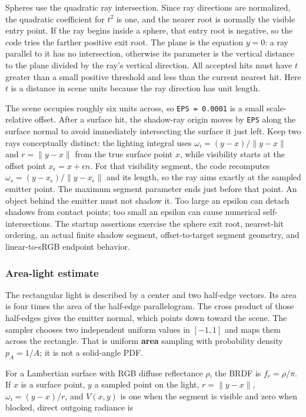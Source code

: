 Spheres use the quadratic ray intersection. Since ray directions are normalized, the quadratic coefficient for \(t^2\) is one, and the nearer root is normally the visible entry point. If the ray begins inside a sphere, that entry root is negative, so the code tries the farther positive exit root. The plane is the equation \(y=0\): a ray parallel to it has no intersection, otherwise its parameter is the vertical distance to the plane divided by the ray's vertical direction. All accepted hits must have \(t\) greater than a small positive threshold and less than the current nearest hit. Here \(t\) is a distance in scene units because the ray direction has unit length.

The scene occupies roughly six units across, so \texttt{EPS\ =\ 0.0001} is a small scale-relative offset. After a surface hit, the shadow-ray origin moves by \texttt{EPS} along the surface normal to avoid immediately intersecting the surface it just left. Keep two rays conceptually distinct: the lighting integral uses \(\omega_i=(y-x)/\|y-x\|\) and \(r=\|y-x\|\) from the true surface point \(x\), while visibility starts at the offset point \(x_\epsilon=x+\epsilon n\). For that visibility segment, the code recomputes \(\omega_s=(y-x_\epsilon)/\|y-x_\epsilon\|\) and its length, so the ray aims exactly at the sampled emitter point. The maximum segment parameter ends just before that point. An object behind the emitter must not shadow it. Too large an epsilon can detach shadows from contact points; too small an epsilon can cause numerical self-intersections. The startup assertions exercise the sphere exit root, nearest-hit ordering, an actual finite shadow segment, offset-to-target segment geometry, and linear-to-sRGB endpoint behavior.

\subsubsection{Area-light estimate}\label{04-visual-computing-ii-ch035-area-light-estimate}

The rectangular light is described by a center and two half-edge vectors. Its area is four times the area of the half-edge parallelogram. The cross product of those half-edges gives the emitter normal, which points down toward the scene. The sampler chooses two independent uniform values in \([-1,1]\) and maps them across the rectangle. That is uniform \textbf{area} sampling with probability density \(p_A=1/A\); it is not a solid-angle PDF.

For a Lambertian surface with RGB diffuse reflectance \(\rho\), the BRDF is \(f_r=\rho/\pi\). If \(x\) is a surface point, \(y\) a sampled point on the light, \(r=\|y-x\|\), \(\omega_i=(y-x)/r\), and \(V(x,y)\) is one when the segment is visible and zero when blocked, direct outgoing radiance is

